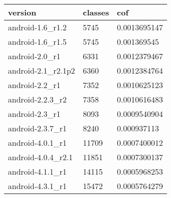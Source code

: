 \begin{tabular}{|l|l|l|}
\hline
version&classes&cof\\
\hline
android-1.6\_r1.2&5745&0.0013695147\\
\hline
android-1.6\_r1.5&5745&0.001369545\\
\hline
android-2.0\_r1&6331&0.0012379467\\
\hline
android-2.1\_r2.1p2&6360&0.0012384764\\
\hline
android-2.2\_r1&7352&0.0010625123\\
\hline
android-2.2.3\_r2&7358&0.0010616483\\
\hline
android-2.3\_r1&8093&0.0009540904\\
\hline
android-2.3.7\_r1&8240&0.000937113\\
\hline
android-4.0.1\_r1&11709&0.0007400012\\
\hline
android-4.0.4\_r2.1&11851&0.0007300137\\
\hline
android-4.1.1\_r1&14115&0.0005968253\\
\hline
android-4.3.1\_r1&15472&0.0005764279\\
\hline
\end{tabular}

